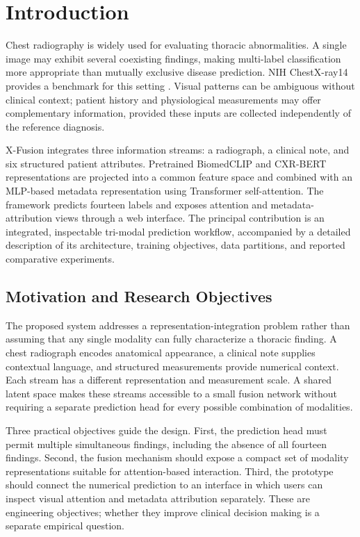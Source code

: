 \documentclass[conference,letterpaper]{IEEEtran}
\begin{document}
\section{Introduction}
Chest radiography is widely used for evaluating thoracic abnormalities. A single image may exhibit several coexisting findings, making multi-label classification more appropriate than mutually exclusive disease prediction. NIH ChestX-ray14 provides a benchmark for this setting \cite{wang2017,nihdataset}. Visual patterns can be ambiguous without clinical context; patient history and physiological measurements may offer complementary information, provided these inputs are collected independently of the reference diagnosis.

X-Fusion integrates three information streams: a radiograph, a clinical note, and six structured patient attributes. Pretrained BiomedCLIP and CXR-BERT representations are projected into a common feature space and combined with an MLP-based metadata representation using Transformer self-attention. The framework predicts fourteen labels and exposes attention and metadata-attribution views through a web interface. The principal contribution is an integrated, inspectable tri-modal prediction workflow, accompanied by a detailed description of its architecture, training objectives, data partitions, and reported comparative experiments.

\subsection{Motivation and Research Objectives}
The proposed system addresses a representation-integration problem rather than assuming that any single modality can fully characterize a thoracic finding. A chest radiograph encodes anatomical appearance, a clinical note supplies contextual language, and structured measurements provide numerical context. Each stream has a different representation and measurement scale. A shared latent space makes these streams accessible to a small fusion network without requiring a separate prediction head for every possible combination of modalities.

Three practical objectives guide the design. First, the prediction head must permit multiple simultaneous findings, including the absence of all fourteen findings. Second, the fusion mechanism should expose a compact set of modality representations suitable for attention-based interaction. Third, the prototype should connect the numerical prediction to an interface in which users can inspect visual attention and metadata attribution separately. These are engineering objectives; whether they improve clinical decision making is a separate empirical question.
\end{document}
